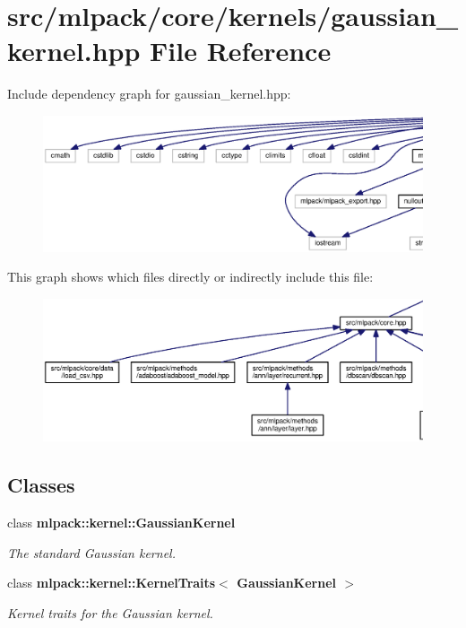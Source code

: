 \section{src/mlpack/core/kernels/gaussian\+\_\+kernel.hpp File Reference}
\label{gaussian__kernel_8hpp}
Include dependency graph for gaussian\+\_\+kernel.\+hpp\+:
\nopagebreak
\begin{figure}[H]
\begin{center}
\leavevmode
\includegraphics[width=350pt]{gaussian__kernel_8hpp__incl}
\end{center}
\end{figure}
This graph shows which files directly or indirectly include this file\+:
\nopagebreak
\begin{figure}[H]
\begin{center}
\leavevmode
\includegraphics[width=350pt]{gaussian__kernel_8hpp__dep__incl}
\end{center}
\end{figure}
\subsection*{Classes}
\begin{DoxyCompactItemize}
\item 
class {\bf mlpack\+::kernel\+::\+Gaussian\+Kernel}
\begin{DoxyCompactList}\small\item\em The standard Gaussian kernel. \end{DoxyCompactList}\item 
class {\bf mlpack\+::kernel\+::\+Kernel\+Traits$<$ Gaussian\+Kernel $>$}
\begin{DoxyCompactList}\small\item\em Kernel traits for the Gaussian kernel. \end{DoxyCompactList}\end{DoxyCompactItemize}
